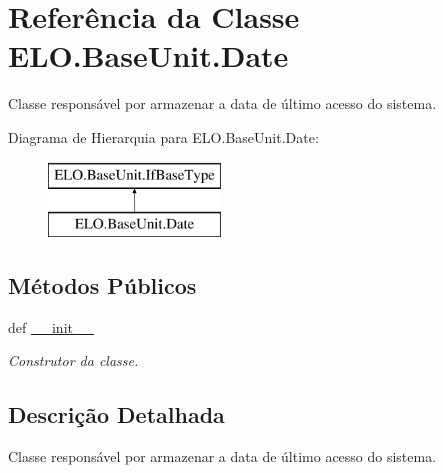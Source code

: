 \hypertarget{classELO_1_1BaseUnit_1_1Date}{\section{Referência da Classe E\-L\-O.\-Base\-Unit.\-Date}
\label{classELO_1_1BaseUnit_1_1Date}
}


Classe responsável por armazenar a data de último acesso do sistema.  


Diagrama de Hierarquia para E\-L\-O.\-Base\-Unit.\-Date\-:\begin{figure}[H]
\begin{center}
\leavevmode
\includegraphics[height=2.000000cm]{d2/d74/classELO_1_1BaseUnit_1_1Date}
\end{center}
\end{figure}
\subsection*{Métodos Públicos}
\begin{DoxyCompactItemize}
\item 
def \hyperlink{classELO_1_1BaseUnit_1_1Date_a97d924fa5f1b2a1d8afbdbfe17b6a852}{\-\_\-\-\_\-init\-\_\-\-\_\-}
\begin{DoxyCompactList}\small\item\em Construtor da classe. \end{DoxyCompactList}\end{DoxyCompactItemize}


\subsection{Descrição Detalhada}
Classe responsável por armazenar a data de último acesso do sistema. 




